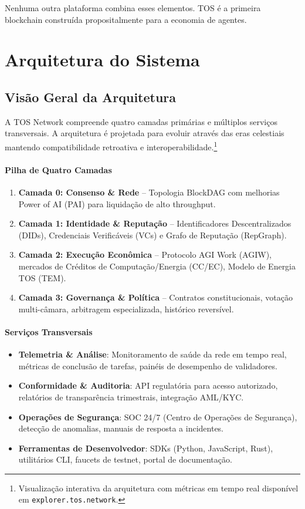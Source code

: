 \documentclass[11pt]{article}
\begin{document}
Nenhuma outra plataforma combina esses elementos. TOS é a primeira blockchain construída propositalmente para a economia de agentes.

\section{Arquitetura do Sistema}
\subsection{Visão Geral da Arquitetura}
A TOS Network compreende quatro camadas primárias e múltiplos serviços transversais. A arquitetura é projetada para evoluir através das eras celestiais mantendo compatibilidade retroativa e interoperabilidade.\footnote{Visualização interativa da arquitetura com métricas em tempo real disponível em \texttt{explorer.tos.network}.}

\paragraph{Pilha de Quatro Camadas}
\begin{enumerate}[noitemsep]
  \item \textbf{Camada 0: Consenso \& Rede} -- Topologia BlockDAG com melhorias Power of AI (PAI) para liquidação de alto throughput.
  \item \textbf{Camada 1: Identidade \& Reputação} -- Identificadores Descentralizados (DIDs), Credenciais Verificáveis (VCs) e Grafo de Reputação (RepGraph).
  \item \textbf{Camada 2: Execução Econômica} -- Protocolo AGI Work (AGIW), mercados de Créditos de Computação/Energia (CC/EC), Modelo de Energia TOS (TEM).
  \item \textbf{Camada 3: Governança \& Política} -- Contratos constitucionais, votação multi-câmara, arbitragem especializada, histórico reversível.
\end{enumerate}

\paragraph{Serviços Transversais}
\begin{itemize}[noitemsep]
  \item \textbf{Telemetria \& Análise}: Monitoramento de saúde da rede em tempo real, métricas de conclusão de tarefas, painéis de desempenho de validadores.
  \item \textbf{Conformidade \& Auditoria}: API regulatória para acesso autorizado, relatórios de transparência trimestrais, integração AML/KYC.
  \item \textbf{Operações de Segurança}: SOC 24/7 (Centro de Operações de Segurança), detecção de anomalias, manuais de resposta a incidentes.
  \item \textbf{Ferramentas de Desenvolvedor}: SDKs (Python, JavaScript, Rust), utilitários CLI, faucets de testnet, portal de documentação.
\end{itemize}
\end{document}
